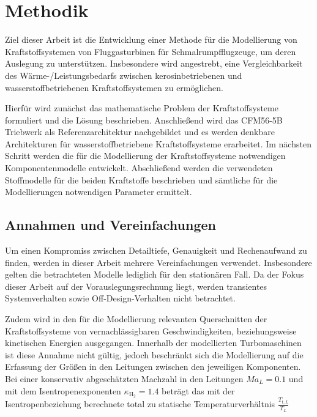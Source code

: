\chapter{Methodik}
\label{chap:methodik}
Ziel dieser Arbeit ist die Entwicklung einer Methode für die Modellierung von Kraftstoffsystemen von Fluggasturbinen für Schmalrumpfflugzeuge, um deren Auslegung zu unterstützen. Insbesondere wird angestrebt, eine Vergleichbarkeit des Wärme-/Leistungsbedarfs zwischen kerosinbetriebenen und wasserstoffbetriebenen Kraftstoffsystemen zu ermöglichen. 

Hierfür wird zunächst das mathematische Problem der Kraftstoffsysteme formuliert und die Lösung beschrieben. Anschließend wird  das CFM56-5B Triebwerk als Referenzarchitektur nachgebildet und es werden denkbare Architekturen für wasserstoffbetriebene Kraftstoffsysteme erarbeitet. Im nächsten Schritt werden die für die Modellierung der Kraftstoffsysteme notwendigen Komponentenmodelle entwickelt. Abschließend werden die verwendeten Stoffmodelle für die beiden Kraftstoffe beschrieben und sämtliche für die Modellierungen notwendigen Parameter ermittelt.

\section{Annahmen und Vereinfachungen}

Um einen Kompromiss zwischen Detailtiefe, Genauigkeit und Rechenaufwand zu finden, werden in dieser Arbeit mehrere Vereinfachungen verwendet. Insbesondere gelten die betrachteten Modelle lediglich für den stationären Fall. Da der Fokus dieser Arbeit auf der Vorauslegungsrechnung liegt, werden transientes Systemverhalten sowie Off-Design-Verhalten nicht betrachtet. 

Zudem wird in den für die Modellierung relevanten Querschnitten der Kraftstoffsysteme von vernachlässigbaren Geschwindigkeiten, beziehungsweise kinetischen Energien ausgegangen. Innerhalb der modellierten Turbomaschinen ist diese Annahme nicht gültig, jedoch beschränkt sich die Modellierung auf die Erfassung der Größen in den Leitungen zwischen den jeweiligen Komponenten. Bei einer konservativ abgeschätzten Machzahl in den Leitungen $Ma_L=0.1$ und mit dem Isentropenexponenten $\kappa_{\mathrm{H}_2} = 1.4$ beträgt das mit der Isentropenbeziehung berechnete total zu statische Temperaturverhältnis  $\frac{T_{t,L}}{T_L}$

